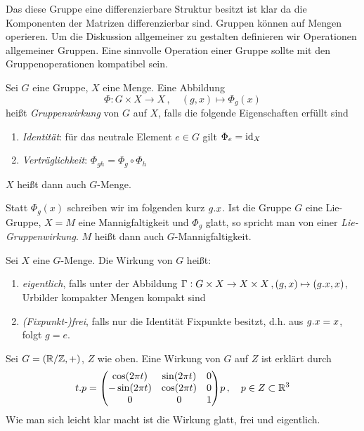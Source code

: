 Das diese Gruppe eine differenzierbare Struktur besitzt ist klar da die
Komponenten der Matrizen differenzierbar sind.
Gruppen können auf Mengen operieren.  Um die Diskussion allgemeiner zu gestalten definieren wir
Operationen allgemeiner Gruppen. 
Eine sinnvolle Operation einer Gruppe sollte mit den Gruppenoperationen
kompatibel sein. 
\begin{definition}[Gruppenwirkung]
Sei $G$ eine Gruppe, $X$ eine Menge. Eine Abbildung
\begin{equation}
\Phi:G\times X\to X\,,\quad (g,x)\mapsto\Phi_g(x)
\end{equation}
heißt \emph{Gruppenwirkung} von $G$ auf $X$, falls die folgende Eigenschaften
erfüllt sind
\begin{enumerate}
  \item \emph{Identität}: für das neutrale Element $e\in G$ gilt
  $\displaystyle\Phi_e=\operatorname{id}_X$
  \item \emph{Verträglichkeit}: $\displaystyle\Phi_{gh}=\Phi_g\circ\Phi_h$
\end{enumerate}
$X$ heißt dann auch $G$-Menge.
\end{definition}
Statt $\Phi_g(x)$ schreiben wir im folgenden kurz $g. x$.
Ist die Gruppe $G$ eine Lie-Gruppe, $X=M$ eine Mannigfaltigkeit und $\Phi_g$
glatt, so spricht man von einer \emph{Lie-Gruppenwirkung}. $M$ heißt dann
auch $G$-Mannigfaltigkeit.
\begin{definition}
Sei $X$ eine $G$-Menge. Die Wirkung von $G$ heißt:
\begin{enumerate}
  \item \emph{eigentlich}, falls unter der Abbildung $\Gamma:
  G\times X\to X\times X\,,(g,x)\mapsto (g . x,x)$, Urbilder kompakter
  Mengen kompakt sind
  \item \emph{(Fixpunkt-)frei}, falls nur die Identität Fixpunkte besitzt, d.h.
  aus $g. x=x$, folgt $g=e$.
\end{enumerate}
\end{definition}
\begin{beispiel}
Sei $G=(\mathbb{R}/\mathbb{Z},+)$, $Z$ wie oben. Eine Wirkung von $G$ auf $Z$ ist
erklärt durch
\begin{equation}
t.p= \begin{pmatrix}
\cos\left( 2\pi t\right)&\sin\left( 2\pi t\right)&0\\
-\sin\left( 2\pi t\right)&\cos\left( 2\pi t\right)&0\\
0&0&1
\end{pmatrix}p\,,\quad p\in Z\subset \Reals^3
\end{equation}
Wie man sich leicht klar macht ist die Wirkung glatt, frei und eigentlich.
\end{beispiel}
